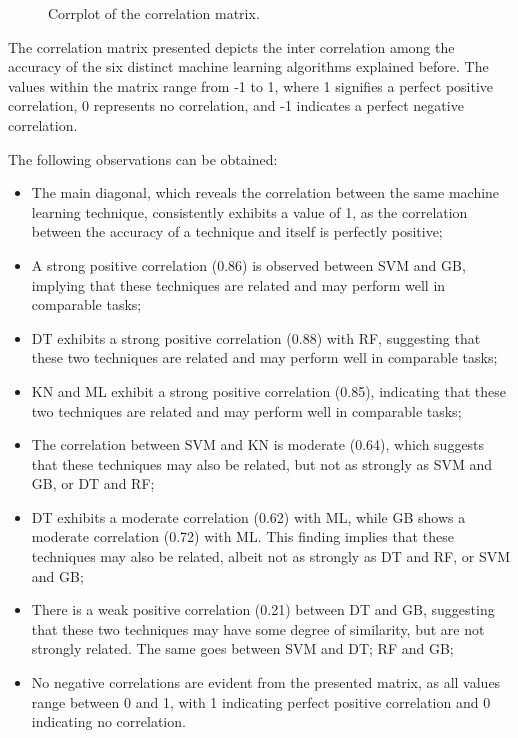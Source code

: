 \documentclass[conference]{IEEEtran}
\begin{document}
\begin{figure}[htbp]
    \caption{Corrplot of the correlation matrix.}
    \label{vehicle_boxplot}
\end{figure}

The correlation matrix presented depicts the inter correlation among the accuracy of the six distinct machine learning algorithms explained before. The values within the matrix range from -1 to 1, where 1 signifies a perfect positive correlation, 0 represents no correlation, and -1 indicates a perfect negative correlation.

The following observations can be obtained:

\begin{itemize}
    \item The main diagonal, which reveals the correlation between the same machine learning technique, consistently exhibits a value of 1, as the correlation between the accuracy of a technique and itself is perfectly positive;
    \item A strong positive correlation (0.86) is observed between SVM and GB, implying that these techniques are related and may perform well in comparable tasks;
    \item DT exhibits a strong positive correlation (0.88) with RF, suggesting that these two techniques are related and may perform well in comparable tasks;
    \item KN and ML exhibit a strong positive correlation (0.85), indicating that these two techniques are related and may perform well in comparable tasks;
    \item The correlation between SVM and KN is moderate (0.64), which suggests that these techniques may also be related, but not as strongly as SVM and GB, or DT and RF;
    \item DT exhibits a moderate correlation (0.62) with ML, while GB shows a moderate correlation (0.72) with ML. This finding implies that these techniques may also be related, albeit not as strongly as DT and RF, or SVM and GB;
    \item There is a weak positive correlation (0.21) between DT and GB, suggesting that these two techniques may have some degree of similarity, but are not strongly related. The same goes between SVM and DT; RF and GB;
    \item No negative correlations are evident from the presented matrix, as all values range between 0 and 1, with 1 indicating perfect positive correlation and 0 indicating no correlation.
\end{itemize}
\end{document}
